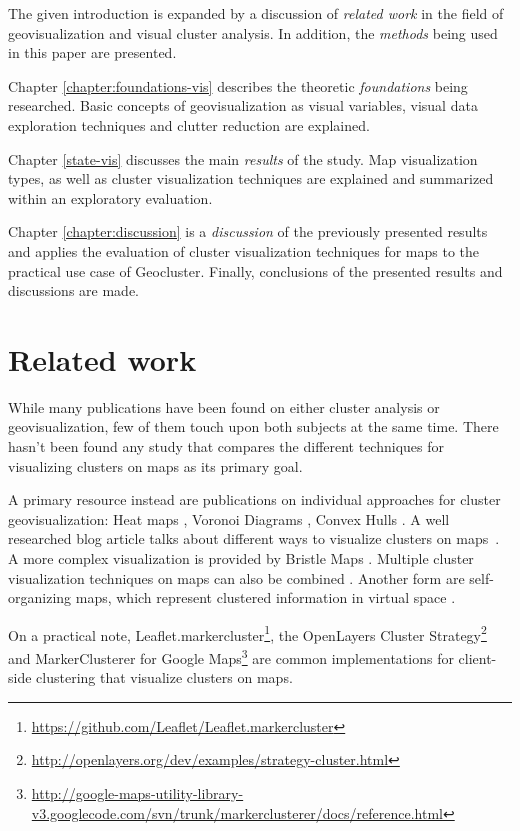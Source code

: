 The given introduction is expanded by a discussion of \textit{related work} in the field of geovisualization and visual cluster analysis. In addition, the \textit{methods} being used in this paper are presented.

Chapter \ref{chapter:foundations-vis} describes the theoretic \textit{foundations} being researched. Basic concepts of geovisualization as visual variables, visual data exploration techniques and clutter reduction are explained.

Chapter \ref{state-vis} discusses the main \textit{results} of the study. Map visualization types, as well as cluster visualization techniques are explained and summarized within an exploratory evaluation.

Chapter \ref{chapter:discussion} is a \textit{discussion} of the previously presented results and applies the evaluation of cluster visualization techniques for maps to the practical use case of Geocluster. Finally, conclusions of the presented results and discussions are made.


\section{Related work}

While many publications have been found on either cluster analysis or geovisualization, few of them touch upon both subjects at the same time. There hasn't been found any study that compares the different techniques for visualizing clusters on maps as its primary goal.

A primary resource instead are publications on individual approaches for cluster geovisualization: 
Heat maps \cite{geotree, hotmap}, Voronoi Diagrams \cite{Delort10vis, voromap}, Convex Hulls \cite{Cristani08geoimagemaps}. A well researched blog article talks about different ways to visualize clusters on maps~\cite{web:clustering-google}. A more complex visualization is provided by Bristle Maps \cite{bristle}. Multiple cluster visualization techniques on maps can also be combined \cite{andrienko2012sca}. Another form are self-organizing maps, which represent clustered information in virtual space \cite{som}.

On a practical note, Leaflet.markercluster\footnote{\url{https://github.com/Leaflet/Leaflet.markercluster}}, the OpenLayers Cluster Strategy\footnote{\url{http://openlayers.org/dev/examples/strategy-cluster.html}} and MarkerClusterer for Google Maps\footnote{\url{http://google-maps-utility-library-v3.googlecode.com/svn/trunk/markerclusterer/docs/reference.html}} are common implementations for client-side clustering that visualize clusters on maps.

